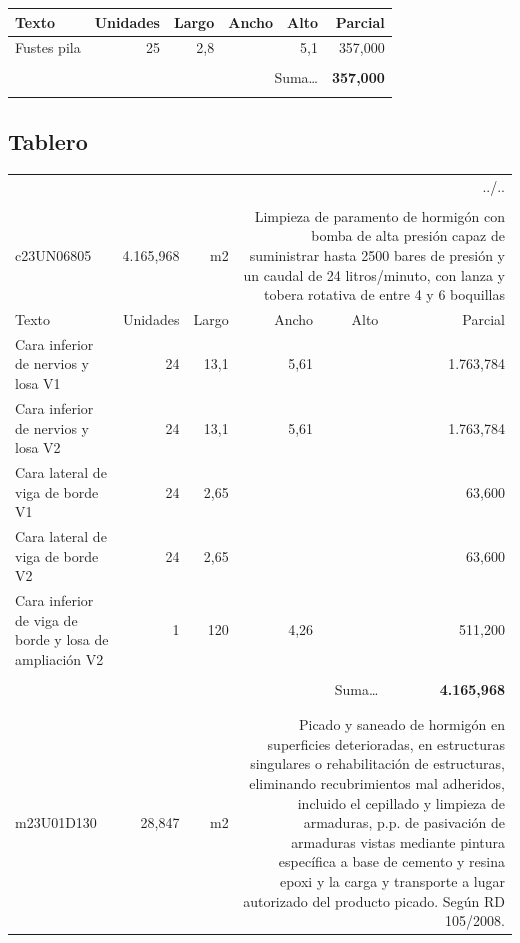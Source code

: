 \documentclass{book}%
\begin{document}
\begin{longtable}{lrrrrr}
Texto&Unidades&Largo&Ancho&Alto&Parcial\\%
\hline%
\multicolumn{1}{p{3.5cm}}{Fustes pila}&25&2,8&&5,1&   357,000\\%
&&&&&\\%
\multicolumn{5}{r}{Suma\ldots}&\textbf{   357,000}\\%
\hline%
&&&&&\\%
\end{longtable}%
\newpage

%
\subsection{Tablero}%
\begin{longtable}{lrrrrr}%
\multicolumn{6}{r}{../..}\\%
\endfoot%
\endlastfoot%
&&&&&\\%
c23UN06805& 4.165,968& m2&\multicolumn{3}{p{6cm}}{\scriptsize Limpieza de paramento de hormigón con bomba de alta presión capaz de suministrar hasta 2500 bares de presión y un caudal de 24 litros/minuto, con lanza y tobera rotativa de entre 4 y 6 boquillas\normalsize}\\%
Texto&Unidades&Largo&Ancho&Alto&Parcial\\%
\hline%
\multicolumn{1}{p{3.5cm}}{Cara inferior de nervios y losa V1}&24&13,1&5,61&& 1.763,784\\%
\multicolumn{1}{p{3.5cm}}{Cara inferior de nervios y losa V2}&24&13,1&5,61&& 1.763,784\\%
\multicolumn{1}{p{3.5cm}}{Cara lateral de viga de borde V1}&24&2,65&&&    63,600\\%
\multicolumn{1}{p{3.5cm}}{Cara lateral de viga de borde V2}&24&2,65&&&    63,600\\%
\multicolumn{1}{p{3.5cm}}{Cara inferior de viga de borde y losa de ampliación V2}&1&120&4,26&&   511,200\\%
&&&&&\\%
\multicolumn{5}{r}{Suma\ldots}&\textbf{ 4.165,968}\\%
\hline%
&&&&&\\%
&&&&&\\%
m23U01D130&    28,847& m2&\multicolumn{3}{p{6cm}}{\scriptsize Picado y saneado de hormigón en superficies deterioradas, en estructuras singulares o rehabilitación de estructuras, eliminando recubrimientos mal adheridos, incluido el cepillado y limpieza de armaduras, p.p. de pasivación de armaduras vistas mediante pintura específica a base de cemento y resina epoxi y la carga y transporte a lugar autorizado del producto picado. Según RD 105/2008.\normalsize}\\%

\end{longtable}
\end{document}
